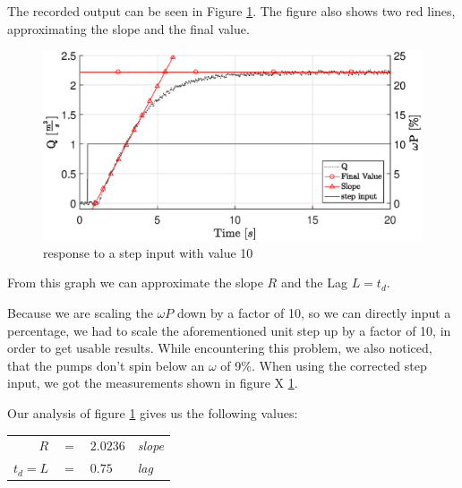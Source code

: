 The recorded output can be seen in Figure \ref{fig:stepin}.
The figure also shows two red lines, approximating the slope and the final value.

\begin{figure}[H]
    \centering
    \includegraphics[width=\textwidth]{figures/07controllerDesign/StepResponseLabeled.eps}
    \caption{response to a step input with value 10}
	\label{fig:stepin}
\end{figure}

From this graph we can approximate the slope $R$ and the Lag $L=t_d$.

Because we are scaling the $\omega P$ down by a factor of 10, so we can directly input a percentage,
we had to scale the aforementioned unit step up by a factor of 10,
in order to get usable results.
While encountering this problem, we also noticed, that the pumps don't spin below an $\omega$ of 9\%.
When using the corrected step input, we got the measurements shown in figure X \ref{fig:stepin}.

Our analysis of figure \ref{fig:stepin} gives us the following values:
\\
\begin{tabular}{r c l l}
	$R$ 	& $=$ & $2.0236$ 	& \footnotesize{\textit{slope}}\\
	$t_d=L$	& $=$ & $0.75$ 		& \footnotesize{\textit{lag}}\\
\end{tabular}


